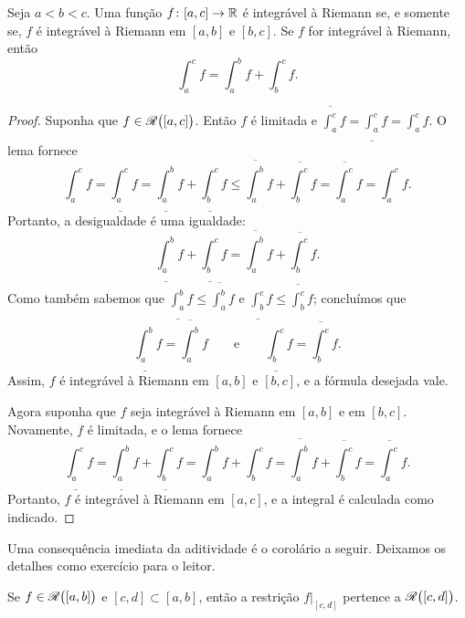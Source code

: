 \begin{prop}
Seja $a < b < c$. Uma função $f \colon [a,c] \to {\mathbb{R}}$ é integrável à Riemann
se, e somente se, $f$ é integrável à Riemann em $[a,b]$ e $[b,c]$. Se
$f$ for integrável à Riemann, então
\begin{equation*}
\int_a^c f
=
\int_a^b f
+
\int_b^c f .
\end{equation*}
\end{prop}

\begin{proof}
Suponha que $f \in {\mathscr{R}}\bigl([a,c]\bigr)$. Então $f$ é limitada e
$\overline{\int_a^c} f = 
\underline{\int_a^c} f = 
\int_a^c f$. O lema fornece
\begin{equation*}
\int_a^c f
=
\underline{\int_a^c} f
 =
\underline{\int_a^b} f + \underline{\int_b^c} f
 \leq
\overline{\int_a^b} f + \overline{\int_b^c} f
 =
\overline{\int_a^c} f
 =
\int_a^c f .
\end{equation*}
Portanto, a desigualdade é uma igualdade:
\begin{equation*}
\underline{\int_a^b} f + \underline{\int_b^c} f
=
\overline{\int_a^b} f + \overline{\int_b^c} f .
\end{equation*}
Como também sabemos que
$\underline{\int_a^b} f \leq \overline{\int_a^b} f$
e
$\underline{\int_b^c} f \leq \overline{\int_b^c} f$; concluímos que
\begin{equation*}
\underline{\int_a^b} f
=
\overline{\int_a^b} f
\qquad \text{e} \qquad
\underline{\int_b^c} f
=
\overline{\int_b^c} f .
\end{equation*}
Assim, $f$ é integrável à Riemann em $[a,b]$ e $[b,c]$, e a fórmula desejada
vale.

Agora suponha que $f$ seja integrável à Riemann em $[a,b]$ e em $[b,c]$.
Novamente, $f$ é limitada, e o lema fornece
\begin{equation*}
\underline{\int_a^c} f
=
\underline{\int_a^b} f + \underline{\int_b^c} f
=
\int_a^b f + \int_b^c f
=
\overline{\int_a^b} f + \overline{\int_b^c} f
=
\overline{\int_a^c} f .
\end{equation*}
Portanto, $f$ é integrável à Riemann em $[a,c]$, e a integral é calculada
como indicado.
\end{proof}

Uma consequência imediata da aditividade é o corolário a seguir. Deixamos
os detalhes como exercício para o leitor.

\begin{cor} \label{intsubcor}
Se $f \in {\mathscr{R}}\bigl([a,b]\bigr)$ e
$[c,d] \subset [a,b]$, então
a restrição $f|_{[c,d]}$ pertence a ${\mathscr{R}}\bigl([c,d]\bigr)$.
\end{cor}

